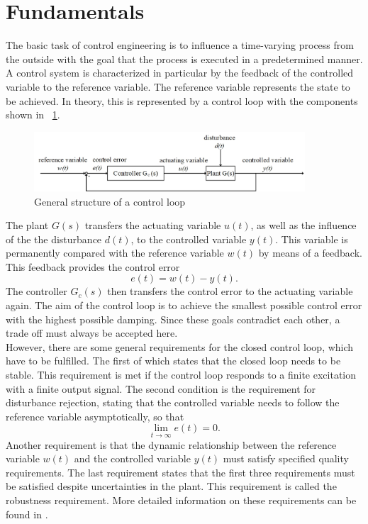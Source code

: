 \section{Fundamentals}
The basic task of control engineering is to influence a time-varying process from the outside with the goal that the process is executed in a predetermined manner. A control system is characterized in particular by the feedback of the controlled variable to the reference variable. The reference variable represents the state to be achieved.
In theory, this is represented by a control loop with the components shown in \figurename~{\ref{fig:control_loop}}.
\begin{figure}
  \centering
  \includegraphics[width=0.9\textwidth]{images/control_loop.jpg}
  \caption[General structure of a control loop]{General structure of a control loop}
  \label{fig:control_loop}
\end{figure}
The plant $G(s)$ transfers the actuating variable $u(t)$, as well as the influence of the the disturbance $d(t)$, to the controlled variable $y(t)$. This variable is permanently compared with the reference variable $w(t)$ by means of a feedback. This feedback provides the control error
\begin{equation}
  e(t) = w(t) - y(t).
 \label{eq:e_t}
\end{equation}
The controller $G_{c}(s)$ then transfers the control error to the actuating variable again. The aim of the control loop is to achieve the smallest possible control error with the highest possible damping. Since these goals contradict each other, a trade off must always be accepted here.\cite{Reg_17}
\\However, there are some general requirements for the closed control loop, which have to be fulfilled. The first of which states that the closed loop needs to be stable. This requirement is met if the control loop responds to a finite excitation with a finite output signal. The second condition is the requirement for disturbance rejection, stating that the controlled variable needs to follow the reference variable asymptotically, so that
\begin{equation}
    \lim\limits_{t \rightarrow \infty}{e(t)} = 0.
 \label{eq:lim_e}
\end{equation}
Another requirement is that the dynamic relationship between the reference variable $w(t)$ and the controlled variable $y(t)$ must satisfy specified quality requirements.  The last requirement states that the first three requirements must be satisfied despite uncertainties in the plant. This requirement is called the robustness requirement. More detailed information on these requirements can be found in \cite{Reg_10}.

